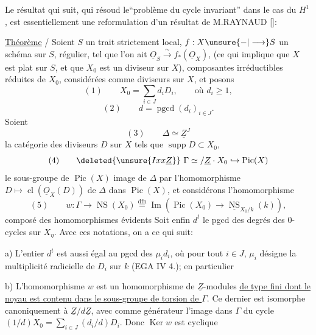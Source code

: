 
Le résultat qui suit, qui résoud le``problème du cycle invariant'' dans le cas du $H^1$, est essentiellement une reformulation d'un résultat de M.RAYNAUD [\quad]:
\margin{$\times$}

\uline{Théorème} / Soient $S$ un trait strictement local, $f:X\unsure{\mathbin{-}|\longrightarrow}S$ un schéma  sur $S$, régulier, tel que l'on ait $\underline{O}_S\xrightarrow{\sim}f_*(\underline{O}_X)$, (ce qui implique que $X$ est plat sur $S$, et que $X_0$ est un diviseur sur $X$),  composantes irréductibles réduites de $X_0$, considérées comme diviseurs sur $X$, et posons \unsure{$\times$}
\[
(1)\qquad X_0=\sum_{i\in J}d_iD_i,\qquad\text{où }d_i\geq1,
\]
\[
(2)\qquad d=\operatorname{pgcd}(d_i)_{i\in J}.
\]
Soient
\[
(3)\qquad\Delta\simeq\underline{Z}^{J}
\]
la catégorie des diviseurs $D$ sur $X$ tels que $\operatorname{supp}D\subset X_0$, 
\[
(4)\qquad\deleted{\unsure{Ixx\underline Z}}\ \Gamma\simeq/\underline Z\cdot X_0\hookrightarrow\operatorname{Pic}(X)
\]
le  sous-groupe de $\operatorname{Pic}(X)$ image de $\Delta$ par l'homomorphisme $D\mapsto\operatorname{cl}(\underline{O}_X(D))$ de $\Delta$ dans $\operatorname{Pic}(X)$, et considérons l'homomorphisme 
\[
(5)\qquad w:\Gamma\longrightarrow\operatorname{NS}(X_0)\overset{\mathrm{dfn}}{=}\operatorname{Im}(\operatorname{Pic}(X_0)\longrightarrow\underline{\operatorname{NS}}_{X_0/k}(k)),
\]
composé des homomorphismes évidents
Soit enfin $d^t$ le pgcd des degrés des 0-cycles sur $X_\eta$. Avec ces notations, on a ce qui suit:

a) L'entier $d^t$ est aussi égal au pgcd des $\mu_i d_i$, où pour tout $i\in J$, $\mu_i$ désigne la multiplicité radicielle de $D_i$ sur $k$ (EGA IV 4.\quad); en particulier 
\margin{$\times$}

b) L'homomorphisme $w$ est un homomorphisme de $\underline Z$-modules \uline{de type fini dont le noyau est contenu dans le sous-groupe de torsion de $\Gamma$}. Ce dernier est isomorphe canoniquement à $\underline Z/d\underline Z$, avec comme générateur l'image dans $\Gamma$ du cycle $(1/d)X_0=\sum_{i\in J}(d_i/d)D_i$. Donc $\operatorname{Ker}w$ est cyclique

